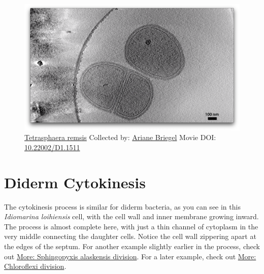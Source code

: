 \documentclass[]{tufte-book}
\begin{document}
\begin{figure}
\includegraphics{movie_stills/5_5} \caption[\protect\hyperlink{tree}{Tetrasphaera remsis} Collected by:
\protect\hyperlink{ariane_briegel}{Ariane Briegel} Movie DOI:
\href{https://doi.org/10.22002/D1.1511}{10.22002/D1.1511}]{\protect\hyperlink{tree}{Tetrasphaera remsis} Collected by:
\protect\hyperlink{ariane_briegel}{Ariane Briegel} Movie DOI:
\href{https://doi.org/10.22002/D1.1511}{10.22002/D1.1511}}\label{fig:5-5}
\end{figure}

\section{Diderm Cytokinesis}\label{diderm-cytokinesis}

The cytokinesis process is similar for diderm bacteria, as you can see
in this \emph{Idiomarina loihiensis} cell, with the cell wall and inner
membrane growing inward. The process is almost complete here, with just
a thin channel of cytoplasm in the very middle connecting the daughter
cells. Notice the cell wall zippering apart at the edges of the septum.
For another example slightly earlier in the process, check out
\protect\hyperlink{Sphingopyxis_alaskensis_division}{More: Sphingopyxis
alaskensis division}. For a later example, check out
\protect\hyperlink{Chloroflexi_division}{More: Chloroflexi division}.
\end{document}
